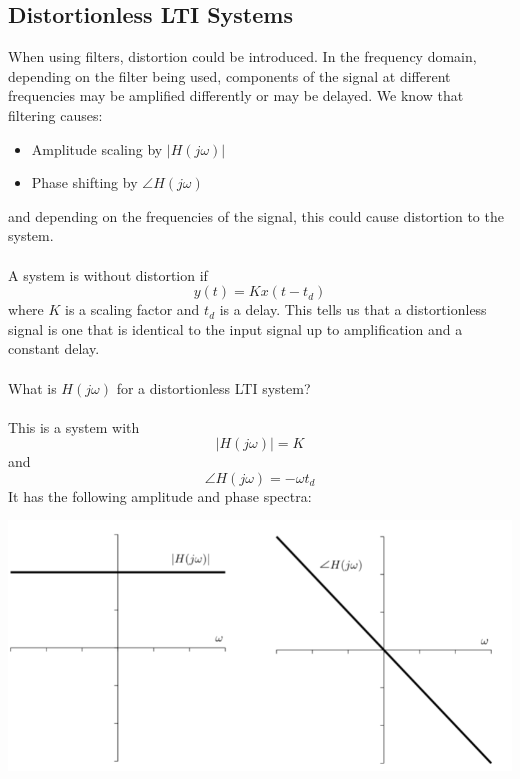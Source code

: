 \documentclass[10pt]{article}
\begin{document}
\subsection*{Distortionless LTI Systems}
When using filters, distortion could be introduced.  In the frequency domain, depending on the filter being used, components of the signal at different frequencies may be amplified differently or may be delayed.  We know that filtering causes:
\begin{itemize}
    \item Amplitude scaling by $|H(j\omega)|$
    \item Phase shifting by $\angle H(j\omega)$
\end{itemize}
and depending on the frequencies of the signal, this could cause distortion to the system.\\\\
A system is without distortion if
\[y(t) = Kx(t - t_d)\]
where $K$ is a scaling factor and $t_d$ is a delay.  This tells us that a distortionless signal is one that is identical to the input signal up to amplification and a constant delay.\\\\
What is $H(j\omega)$ for a distortionless LTI system?\\\\
This is a system with 
\[|H(j\omega)| = K\]
and
\[\angle H(j\omega) = -\omega t_d\]
It has the following amplitude and phase spectra:
\begin{center}
    \includegraphics[scale=0.5]{W8_2.png}
\end{center}
\end{document}
